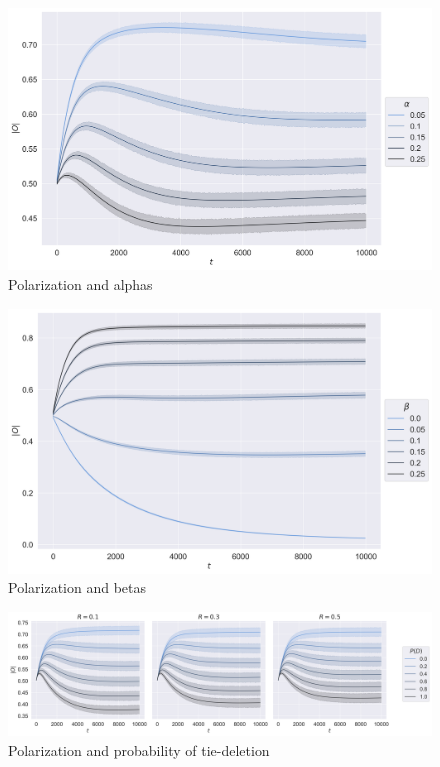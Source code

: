 \documentclass{article}
\begin{document}
\begin{figure}[H]
    \centering
    \includegraphics[width=.8\linewidth]{../plots/overall/Absolute_Opinion_Positive_Learning_Rate.png}
  \caption{Polarization and alphas}
  \label{fig:sfig1}
\end{figure}

\begin{figure}[H]
    \centering
    \includegraphics[width=.8\linewidth]{../plots/overall/Absolute_Opinion_Negative_Learning_Rate.png}
  \caption{Polarization and betas}
  \label{fig:sfig1}
\end{figure}

\begin{figure}[H]
    \centering
    \includegraphics[width=.8\linewidth]{../plots/overall/Absolute_Opinion_Tie_Dissolution.png}
  \caption{Polarization and probability of tie-deletion}
  \label{fig:sfig1}
\end{figure}
\end{document}
